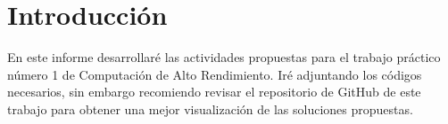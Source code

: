 \graphicspath{{Images/}}

\section{Introducción}
En este informe desarrollaré las actividades propuestas para el trabajo práctico número 1 de Computación de Alto Rendimiento. Iré adjuntando los códigos necesarios, sin embargo recomiendo revisar el repositorio de GitHub \cite{repositorio} de este trabajo para obtener una mejor visualización de las soluciones propuestas.
